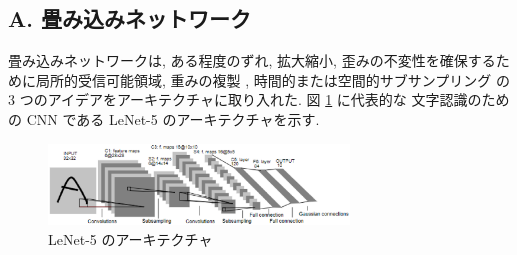 \documentclass[twocolumn]{jarticle}     %
\begin{document}
\subsection*{A. 畳み込みネットワーク}
畳み込みネットワークは, ある程度のずれ, 拡大縮小, 歪みの不変性を確保するために局所的受信可能領域, 重みの複製 , 時間的または空間的サブサンプリング の 3 つのアイデアをアーキテクチャに取り入れた. 図 \ref{fig:LeNet-5} に代表的な 文字認識のための CNN である LeNet-5 のアーキテクチャを示す.
\begin{figure}[t]
  \centering
  \includegraphics[width=80mm]{assets/2.eps}
  \caption{LeNet-5 のアーキテクチャ}
  \label{fig:LeNet-5}
\end{figure}
\end{document}
